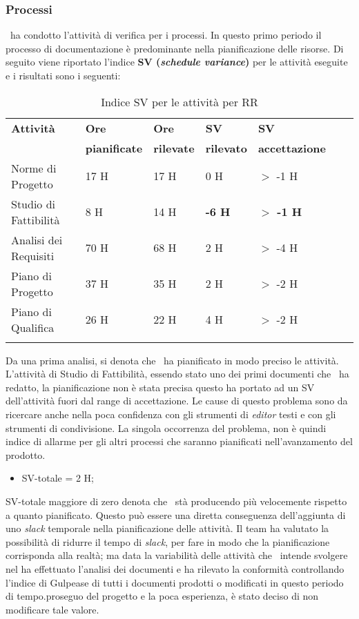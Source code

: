 \subsubsection{Processi}
\gruppo ~ha condotto l'attività di verifica per i processi. In questo primo periodo il processo di documentazione è predominante nella pianificazione delle risorse. Di seguito viene riportato l'indice \textbf{SV (\textit{schedule variance})} per le attività eseguite e i risultati sono i seguenti:
\begin{longtable}{lllllXr}
\toprule
\textbf{Attività} & \textbf{Ore} & \textbf{Ore} & \textbf{SV} & \textbf{SV} \\
& \textbf{pianificate} & \textbf{rilevate} & \textbf{rilevato} & \textbf{accettazione}\\
\toprule
Norme di Progetto & 17 H & 17 H & 0 H & $>$ -1 H\\
\midrule
Studio di Fattibilità & 8 H & 14 H & \textbf{-6 H} & \textbf{$>$ -1 H}\\
\midrule
Analisi dei Requisiti & 70 H & 68 H & 2 H & $>$ -4 H\\
\midrule
Piano di Progetto & 37 H & 35 H & 2 H & $>$ -2 H\\
\midrule
Piano di Qualifica & 26 H & 22 H & 4 H & $>$ -2 H\\
\bottomrule
\caption{Indice SV per le attività per RR}
\end{longtable}
Da una prima analisi, si denota che \gruppo ~ha pianificato in modo preciso le attività.
L'attività di Studio di Fattibilità, essendo stato uno dei primi documenti che \gruppo ~ha redatto, la pianificazione non è stata precisa questo ha portato ad un SV dell'attività fuori dal range di accettazione. Le cause di questo problema sono da ricercare anche nella poca confidenza con gli strumenti di \textit{editor} testi e con gli strumenti di condivisione. La singola occorrenza del problema, non è quindi indice di allarme per gli altri processi che saranno pianificati nell'avanzamento del prodotto.
\begin{itemize}
\item SV-totale = 2 H;
\end{itemize}
SV-totale maggiore di zero denota che \gruppo ~stà producendo più velocemente rispetto a quanto pianificato. Questo può essere una diretta conseguenza dell'aggiunta di uno \textit{slack} temporale nella pianificazione delle attività.
Il team ha valutato la possibilità di ridurre il tempo di \textit{slack}, per fare in modo che la pianificazione corrisponda alla realtà; ma data la variabilità delle attività che \gruppo ~intende svolgere nel \gruppo ha effettuato l'analisi dei documenti e ha rilevato la conformità controllando l'indice di Gulpease di tutti i documenti prodotti o modificati in questo periodo di tempo.proseguo del progetto e la poca esperienza, è stato deciso di non modificare tale valore.\\
